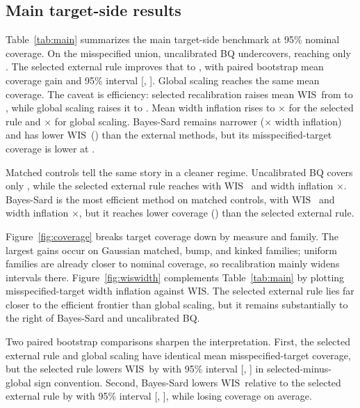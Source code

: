 \documentclass{article}
\newcommand{\wis}{\ensuremath{\mathrm{WIS}}}
\begin{document}
\subsection{Main target-side results}
Table~\ref{tab:main} summarizes the main target-side benchmark at 95\% nominal coverage. On the misspecified union, uncalibrated BQ undercovers, reaching only \MissUncalCoverage{}. The selected external rule improves that to \MissSelectedCoverage{}, with paired bootstrap mean coverage gain \SelectedVsUncalCoverageDiffMean{} and 95\% interval [\SelectedVsUncalCoverageDiffLower{}, \SelectedVsUncalCoverageDiffUpper{}]. Global scaling reaches the same mean coverage. The caveat is efficiency: selected recalibration raises mean \wis\ from \MissUncalWIS{} to \MissSelectedWIS{}, while global scaling raises it to \MissGlobalWIS{}. Mean width inflation rises to \MissSelectedWidthInfl{}$\times$ for the selected rule and \MissGlobalWidthInfl{}$\times$ for global scaling. Bayes-Sard remains narrower (\MissBayesWidthInfl{}$\times$ width inflation) and has lower \wis\ (\MissBayesWIS{}) than the external methods, but its misspecified-target coverage is lower at \MissBayesCoverage{}.

Matched controls tell the same story in a cleaner regime. Uncalibrated BQ covers only \MatchedUncalCoverage{}, while the selected external rule reaches \MatchedSelectedCoverage{} with \wis\ \MatchedSelectedWIS{} and width inflation \MatchedSelectedWidthInfl{}$\times$. Bayes-Sard is the most efficient method on matched controls, with \wis\ \MatchedBayesWIS{} and width inflation \MatchedBayesWidthInfl{}$\times$, but it reaches lower coverage (\MatchedBayesCoverage{}) than the selected external rule.

Figure~\ref{fig:coverage} breaks target coverage down by measure and family. The largest gains occur on Gaussian matched, bump, and kinked families; uniform families are already closer to nominal coverage, so recalibration mainly widens intervals there. Figure~\ref{fig:wiswidth} complements Table~\ref{tab:main} by plotting misspecified-target width inflation against \wis. The selected external rule lies far closer to the efficient frontier than global scaling, but it remains substantially to the right of Bayes-Sard and uncalibrated BQ.

Two paired bootstrap comparisons sharpen the interpretation. First, the selected external rule and global scaling have identical mean misspecified-target coverage, but the selected rule lowers \wis\ by \SelectedVsGlobalWISDiffMean{} with 95\% interval [\SelectedVsGlobalWISDiffLower{}, \SelectedVsGlobalWISDiffUpper{}] in selected-minus-global sign convention. Second, Bayes-Sard lowers \wis\ relative to the selected external rule by \BayesVsSelectedWISDiffMean{} with 95\% interval [\BayesVsSelectedWISDiffLower{}, \BayesVsSelectedWISDiffUpper{}], while losing \BayesVsSelectedCoverageDiffMean{} coverage on average.
\end{document}
